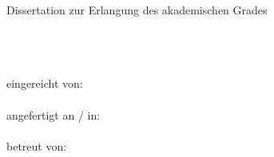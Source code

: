 \null
\vspace{2\baselineskip}
\noindent
Dissertation zur Erlangung des akademischen Grades \\
\tDegree \\
\vspace{\baselineskip}
\noindent \\
\tTitle \\
\vspace{\baselineskip}

\noindent
eingereicht von: \\
\tAuthor \\

\noindent
angefertigt an / in: \\
\tDepartment \\

\noindent
betreut von: \\
\tSupervisor \\

\noindent
\tSubmissionMonth{}~\tSubmissionYear \\
\vspace{5\baselineskip}
